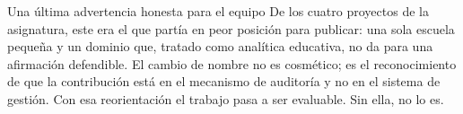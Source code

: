 \documentclass[11pt,a4paper]{article}
\begin{document}
\vspace{8pt}
\begin{aviso}{Una última advertencia honesta para el equipo}
	De los cuatro proyectos de la asignatura, este era el que partía en peor posición para publicar: una sola escuela pequeña y un dominio que, tratado como analítica educativa, no da para una afirmación defendible. El cambio de nombre no es cosmético; es el reconocimiento de que la contribución está en el mecanismo de auditoría y no en el sistema de gestión. Con esa reorientación el trabajo pasa a ser evaluable. Sin ella, no lo es.
\end{aviso}

\nocite{*}


\end{document}
